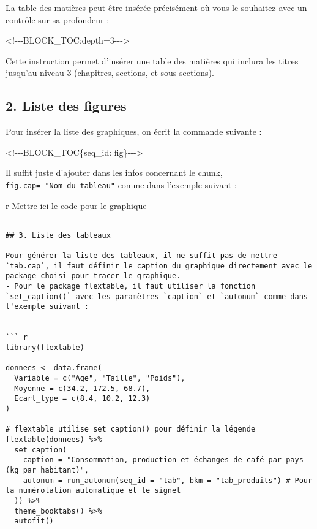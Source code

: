 \documentclass[
]{article}
\newenvironment{Shaded}{\begin{snugshade}}{\end{snugshade}}
\newcommand{\NormalTok}[1]{#1}
\begin{document}
La table des matières peut être insérée précisément où vous le souhaitez
avec un contrôle sur sa profondeur :

\begin{Shaded}
\begin{Highlighting}[]
\NormalTok{\textless{}!{-}{-}{-}BLOCK\_TOC:depth=3{-}{-}{-}\textgreater{}}
\end{Highlighting}
\end{Shaded}

Cette instruction permet d'insérer une table des matières qui inclura
les titres jusqu'au niveau 3 (chapitres, sections, et sous-sections).

\subsection{2. Liste des figures}\label{liste-des-figures}

Pour insérer la liste des graphiques, on écrit la commande suivante :

\begin{Shaded}
\begin{Highlighting}[]
\NormalTok{\textless{}!{-}{-}{-}BLOCK\_TOC\{seq\_id: \textquotesingle{}fig\textquotesingle{}\}{-}{-}{-}\textgreater{}}
\end{Highlighting}
\end{Shaded}

Il suffit juste d'ajouter dans les infos concernant le chunk,
\texttt{fig.cap=\ "Nom\ du\ tableau"} comme dans l'exemple suivant :

\begin{Shaded}
\begin{Highlighting}[]

\NormalTok{\textasciigrave{}\textasciigrave{}\textasciigrave{} r}
\NormalTok{Mettre ici le code pour le graphique}
\end{Highlighting}
\end{Shaded}

\begin{verbatim}

## 3. Liste des tableaux

Pour générer la liste des tableaux, il ne suffit pas de mettre `tab.cap`, il faut définir le caption du graphique directement avec le package choisi pour tracer le graphique.
- Pour le package flextable, il faut utiliser la fonction `set_caption()` avec les paramètres `caption` et `autonum` comme dans l'exemple suivant : 


``` r
library(flextable)

donnees <- data.frame(
  Variable = c("Age", "Taille", "Poids"),
  Moyenne = c(34.2, 172.5, 68.7),
  Ecart_type = c(8.4, 10.2, 12.3)
)

# flextable utilise set_caption() pour définir la légende
flextable(donnees) %>%
  set_caption(
    caption = "Consommation, production et échanges de café par pays (kg par habitant)",
    autonum = run_autonum(seq_id = "tab", bkm = "tab_produits") # Pour la numérotation automatique et le signet
  )) %>%
  theme_booktabs() %>%
  autofit()
\end{verbatim}
\end{document}

